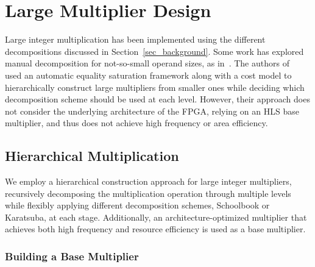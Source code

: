 \documentclass[conference]{IEEEtran}
\begin{document}
\section{Large Multiplier Design} \label{sec_diff_approaches}
Large integer multiplication has been implemented using the different decompositions discussed in Section~\ref{sec_background}. 
Some work has explored manual decomposition for not-so-small operand sizes, as in~\cite{pascaLargeMultipliersLessDSP2009,royTileMultiplicationEfficient2014,kummKaratsubaRectangularMultipliers2018}.
The authors of~\cite{zhangIMpressLargeInteger2022} used an automatic equality saturation framework along with a cost model to hierarchically construct large multipliers from smaller ones while deciding which decomposition scheme should be used at each level.
However, their approach does not consider the underlying architecture of the FPGA, relying on an HLS base multiplier, and thus does not achieve high frequency or area efficiency. 
 
\subsection{Hierarchical Multiplication}
We employ a hierarchical construction approach for large integer multipliers, recursively decomposing the multiplication operation through multiple levels while flexibly applying different decomposition schemes, Schoolbook or Karatsuba, at each stage.
Additionally, an architecture-optimized multiplier that achieves both high frequency and resource efficiency is used as a base multiplier.

\subsubsection{Building a Base Multiplier}


\end{document}
